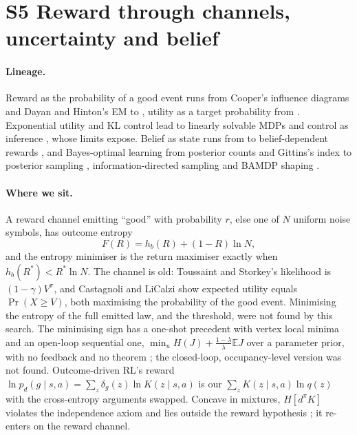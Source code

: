 \documentclass[10pt]{article}
\newcommand{\dpi}{d^\pi}
\begin{document}
\section{S5 Reward through channels, uncertainty and belief}

\paragraph{Lineage.}
Reward as the probability of a good event runs from Cooper's influence diagrams and Dayan and Hinton's EM to \citet{Toussaint-probabilistic06}, utility as a target probability from \citet{Castagnoli-expected96}. Exponential utility and KL control lead to linearly solvable MDPs \citep{Todorov-efficient09} and control as inference \citep{Levine-reinforcement18}, whose limits \citet{ODonoghue-making20} expose. Belief as state runs from \citet{Astrom-optimal65} to belief-dependent rewards \citep{Araya-pomdp10}, and Bayes-optimal learning from posterior counts \citep{Bellman-adaptive59} and Gittins's index \citep{Gittins-bandit79} to posterior sampling \citep{Osband-more13,Osband-deep17}, information-directed sampling \citep{Russo-learning14} and BAMDP shaping \citep{Lidayan-bamdp25}.

\paragraph{Where we sit.}
A reward channel emitting ``good'' with probability $r$, else one of $N$ uniform noise symbols, has outcome entropy
\[
F(R)=h_b(R)+(1-R)\ln N ,
\]
and the entropy minimiser is the return maximiser exactly when $h_b(R^*)<R^*\ln N$. The channel is old: Toussaint and Storkey's likelihood is $(1-\gamma)V^\pi$, and Castagnoli and LiCalzi show expected utility equals $\Pr(X\ge V)$, both maximising the probability of the good event. Minimising the entropy of the full emitted law, and the threshold, were not found by this search. The minimising sign has a one-shot precedent with vertex local minima \citep{Allahverdyan-adaptive18} and an open-loop sequential one, $\min_u H(J)+\tfrac{1-\lambda}{\lambda}\mathbb{E}J$ over a parameter prior, with no feedback and no theorem \citep{Adurthi-minimum14}; the closed-loop, occupancy-level version was not found. Outcome-driven RL's reward $\ln p_d(g\mid s,a)=\sum_z \delta_g(z)\ln K(z\mid s,a)$ \citep{Rudner-outcomedriven21} is our $\sum_z K(z\mid s,a)\ln q(z)$ with the cross-entropy arguments swapped. Concave in mixtures, $H[\dpi K]$ violates the independence axiom and lies outside the reward hypothesis \citep{Bowling-settling23}; it re-enters on the reward channel.
\end{document}
